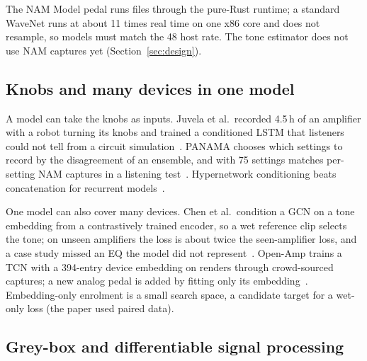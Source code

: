 \begin{inapp}
The NAM Model pedal runs  files through the pure-Rust 
runtime; a standard WaveNet runs at about 11 times real time on one x86 core
and does not resample, so models must match the 48\kHz{} host rate. The tone
estimator does not use NAM captures yet (Section~\ref{sec:design}).
\end{inapp}

\subsection{Knobs and many devices in one model}

A model can take the knobs as inputs. Juvela et al.\ recorded 4.5\,h of an
amplifier with a robot turning its knobs and trained a conditioned LSTM that
listeners could not tell from a circuit simulation~\cite{juvela2023endtoend}.
PANAMA chooses which settings to record by the disagreement of an ensemble, and
with 75 settings matches per-setting NAM captures in a listening
test~\cite{grotschla2025parametric}. Hypernetwork conditioning beats
concatenation for recurrent models~\cite{yeh2024hyper}.

One model can also cover many devices. Chen et al.\ condition a GCN on a tone
embedding from a contrastively trained encoder, so a wet reference clip selects
the tone; on unseen amplifiers the loss is about twice the seen-amplifier loss,
and a case study missed an EQ the model did not
represent~\cite{chen2024zeroshot,chen2024demo}. Open-Amp trains a TCN with a
394-entry device embedding on renders through crowd-sourced captures; a new
analog pedal is added by fitting only its embedding~\cite{wright2025openamp}.
Embedding-only enrolment is a small search space, a candidate target for a
wet-only loss (the paper used paired data).

\subsection{Grey-box and differentiable signal processing}

